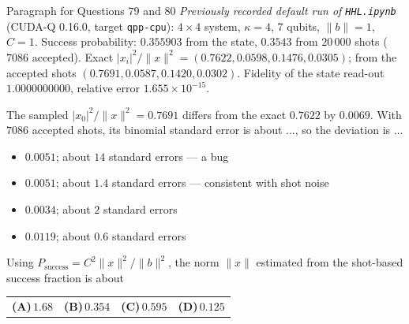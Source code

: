 \documentclass[11pt,a4paper]{article}
\newcommand{\optlabel}[1]{\textbf{(#1)}}
\newenvironment{qitem}[1]{\begin{list}{}{\setlength{\leftmargin}{3.3em}\setlength{\labelwidth}{3.1em}%
  \setlength{\labelsep}{0.2em}\setlength{\topsep}{3pt}\setlength{\parsep}{3pt}}\item[\textbf{Q.#1}\hfill]}{\end{list}}
\newcommand{\qsep}{\par\vspace{2pt}{\color{black!15}\hrule}\vspace{4pt}}
\begin{document}
\begin{passagebox}{Paragraph for Questions 79 and 80}
\emph{Previously recorded default run of \texttt{HHL.ipynb}} (CUDA-Q 0.16.0, target \texttt{qpp-cpu}): $4\times4$ system, $\kappa = 4$, 7 qubits, $\|b\| = 1$, $C = 1$.
Success probability: $0.355903$ from the state, $0.3543$ from $20\,000$ shots ($7086$ accepted). Exact $|x_i|^2/\|x\|^2 = (0.7622, 0.0598, 0.1476, 0.0305)$; from the accepted shots
$(0.7691, 0.0587, 0.1420, 0.0302)$. Fidelity of the state read-out $1.0000000000$, relative error $1.655\times10^{-15}$.
\end{passagebox}
\begin{qitem}{79}
The sampled $|x_0|^2/\|x\|^2 = 0.7691$ differs from the exact $0.7622$ by $0.0069$. With $7086$ accepted shots, its binomial standard error is about ..., so the deviation is ...
\begin{itemize}[leftmargin=2.6em, labelsep=0.4em, itemsep=2pt, topsep=3pt]
\item[\optlabel{A}] $0.0051$; about $14$ standard errors --- a bug
\item[\optlabel{B}] $0.0051$; about $1.4$ standard errors --- consistent with shot noise
\item[\optlabel{C}] $0.0034$; about $2$ standard errors
\item[\optlabel{D}] $0.0119$; about $0.6$ standard errors
\end{itemize}
\end{qitem}
\qsep

\begin{qitem}{80}
Using $P_{\text{success}} = C^2\|x\|^2/\|b\|^2$, the norm $\|x\|$ estimated from the shot-based success fraction is about
\par\smallskip\noindent\begin{tabularx}{\linewidth}{@{}*{4}{L}@{}}
\optlabel{A}\,$1.68$ & \optlabel{B}\,$0.354$ & \optlabel{C}\,$0.595$ & \optlabel{D}\,$0.125$
\end{tabularx}
\end{qitem}
\qsep

\newpage
\end{document}
